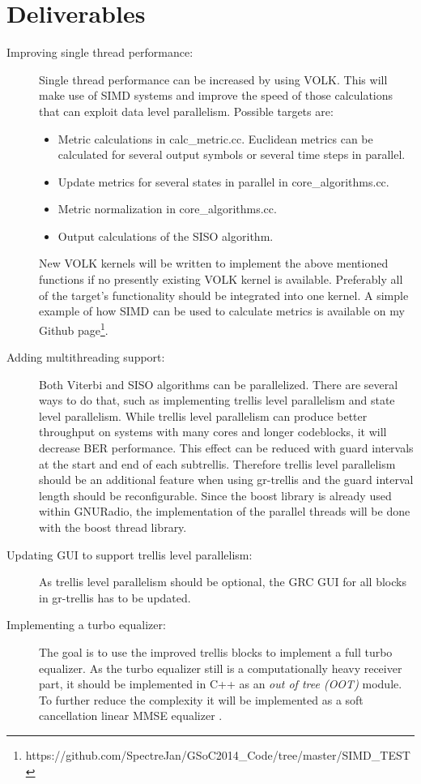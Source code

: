 \documentclass[11pt,		%
	    DIV12,		%
	    a4paper,		%
	    final,		%
	    halfparskip,	%
	    ]{scrartcl}		%
\begin{document}
\section{Deliverables}
\begin{description}
  \item[Improving single thread performance:] Single thread performance can be increased by using VOLK. This will make use of SIMD systems and improve the speed of those calculations that can exploit data level parallelism. Possible targets are:
  \begin{itemize}
        \item Metric calculations in calc\_metric.cc. Euclidean metrics can be calculated for several output symbols or several time steps in parallel. 
        \item Update metrics for several states in parallel in core\_algorithms.cc.  
        \item Metric normalization in core\_algorithms.cc.
        \item Output calculations of the SISO algorithm.
  \end{itemize}  
New VOLK kernels will be written to implement the above mentioned functions if no presently existing VOLK kernel is available. Preferably all of the target's functionality should be integrated into one kernel. A simple example of how SIMD can be used to calculate metrics is available on my Github page\footnote[1]{https://github.com/SpectreJan/GSoC2014\_Code/tree/master/SIMD\_TEST}.    
  \item[Adding multithreading support:] Both Viterbi and SISO algorithms can be parallelized. There are several ways to do that, such as implementing trellis level parallelism and state level parallelism. While trellis level parallelism can produce  better throughput on systems with many cores and longer codeblocks, it will decrease BER performance. This effect can be reduced with guard intervals at the start and end of each subtrellis. Therefore trellis level parallelism should be an additional feature when using gr-trellis and the guard interval length should be reconfigurable. Since the boost library is already used within GNURadio, the implementation of the parallel threads will be done with the boost thread library.    
  \item[Updating GUI to support trellis level parallelism:] As trellis level parallelism should be optional, the GRC GUI for all blocks in gr-trellis has to be updated.
  \item[Implementing a turbo equalizer:] The goal is to use the improved trellis blocks to implement a full turbo equalizer. As the turbo equalizer still is a computationally heavy receiver part, it should be implemented in C++ as an \textit{out of tree (OOT)} module. To further reduce the complexity it will be implemented as a soft cancellation linear MMSE equalizer \cite{te02}.    
\end{description}   
\end{document}
